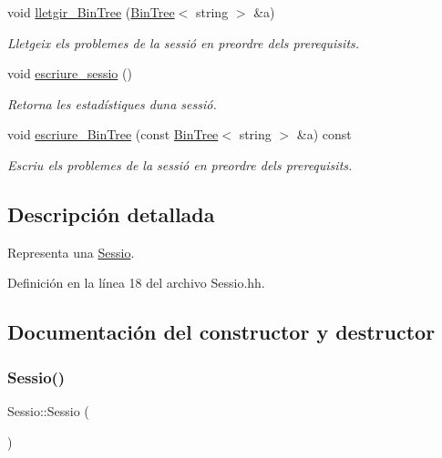 \begin{DoxyCompactItemize}
void \mbox{\hyperlink{class_sessio_ac461dad4b5440b44afe62a042ab0c4b2}{lletgir\+\_\+\+Bin\+Tree}} (\mbox{\hyperlink{class_bin_tree}{Bin\+Tree}}$<$ string $>$ \&a)
\begin{DoxyCompactList}\small\item\em Lletgeix els problemes de la sessió en preordre dels prerequisits. \end{DoxyCompactList}\item 
void \mbox{\hyperlink{class_sessio_a3d0efb2a3395d34c04369e15bf29824f}{escriure\+\_\+sessio}} ()
\begin{DoxyCompactList}\small\item\em Retorna les estadístiques d\textquotesingle{}una sessió. \end{DoxyCompactList}\item 
void \mbox{\hyperlink{class_sessio_afaf8fb85e369bb5409b0139693d6ad02}{escriure\+\_\+\+Bin\+Tree}} (const \mbox{\hyperlink{class_bin_tree}{Bin\+Tree}}$<$ string $>$ \&a) const
\begin{DoxyCompactList}\small\item\em Escriu els problemes de la sessió en preordre dels prerequisits. \end{DoxyCompactList}\end{DoxyCompactItemize}


\subsection{Descripción detallada}
Representa una \mbox{\hyperlink{class_sessio}{Sessio}}. 

Definición en la línea 18 del archivo Sessio.\+hh.



\subsection{Documentación del constructor y destructor}
\mbox{\label{class_sessio_a2aeda3ca0902761f07d837538244539b}} 
\subsubsection{\texorpdfstring{Sessio()}{Sessio()}\hspace{0.1cm}{\footnotesize\ttfamily [1/2]}}
{\footnotesize\ttfamily Sessio\+::\+Sessio (\begin{DoxyParamCaption}{ }\end{DoxyParamCaption})}



